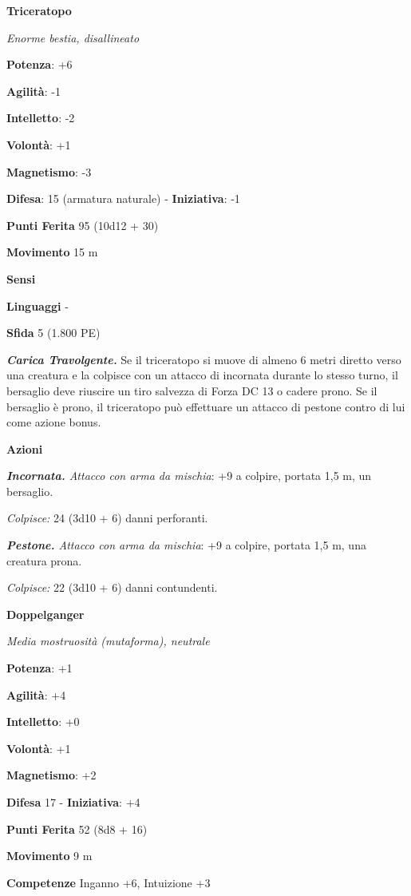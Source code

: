 \begin{multicols}{2}
\textbf{Triceratopo}

\emph{Enorme bestia, disallineato}

\textbf{Potenza}: +6

\textbf{Agilità}: -1

\textbf{Intelletto}: -2

\textbf{Volontà}: +1

\textbf{Magnetismo}: -3

\textbf{Difesa}: 15 (armatura naturale) - \textbf{Iniziativa}: -1

\textbf{Punti Ferita} 95 (10d12 + 30)

\textbf{Movimento} 15 m

\textbf{Sensi} 

\textbf{Linguaggi} -

\textbf{Sfida} 5 (1.800 PE)

\emph{\textbf{Carica Travolgente.}} Se il triceratopo si muove di almeno
6 metri diretto verso una creatura e la colpisce con un attacco di
incornata durante lo stesso turno, il bersaglio deve riuscire un tiro
salvezza di Forza DC 13 o cadere prono. Se il bersaglio è prono, il
triceratopo può effettuare un attacco di pestone contro di lui come
azione bonus.

\textbf{Azioni}

\emph{\textbf{Incornata.} Attacco con arma da mischia}: +9 a colpire,
portata 1,5 m, un bersaglio.

\emph{Colpisce:} 24 (3d10 + 6) danni perforanti.

\emph{\textbf{Pestone.} Attacco con arma da mischia}: +9 a colpire,
portata 1,5 m, una creatura prona.

\emph{Colpisce:} 22 (3d10 + 6) danni contundenti.



\textbf{Doppelganger}

\emph{Media mostruosità (mutaforma), neutrale}

\textbf{Potenza}: +1

\textbf{Agilità}: +4

\textbf{Intelletto}: +0

\textbf{Volontà}: +1

\textbf{Magnetismo}: +2

\textbf{Difesa} 17 - \textbf{Iniziativa}: +4

\textbf{Punti Ferita} 52 (8d8 + 16)

\textbf{Movimento} 9 m

\textbf{Competenze} Inganno +6, Intuizione +3


\end{multicols}
